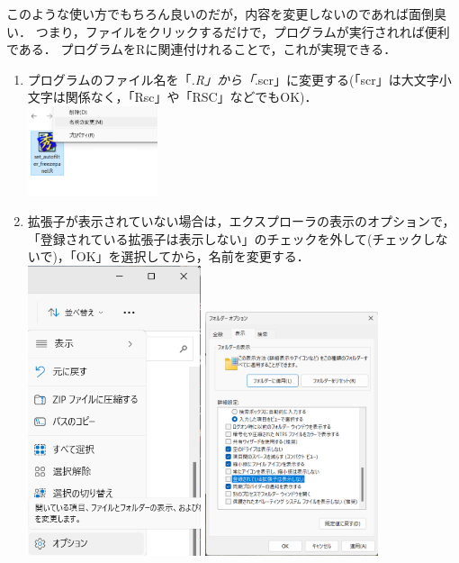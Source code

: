 \documentclass[
]{article}
\providecommand{\tightlist}{%
  \setlength{\itemsep}{0pt}\setlength{\parskip}{0pt}}
\begin{document}
このような使い方でもちろん良いのだが，内容を変更しないのであれば面倒臭い．
つまり，ファイルをクリックするだけで，プログラムが実行されれば便利である．
プログラムをRに関連付けれることで，これが実現できる．

\begin{enumerate}
\def\labelenumi{\arabic{enumi}.}
\tightlist
\item
  プログラムのファイル名を「\emph{.R」から「}.scr」に変更する(「scr」は大文字小文字は関係なく，「Rsc」や「RSC」などでもOK)．\\
  \includegraphics[width=0.3\textwidth,height=\textheight]{img/assoc_01.png}
\item
  拡張子が表示されていない場合は，エクスプローラの表示のオプションで，「登録されている拡張子は表示しない」のチェックを外して(チェックしないで)，「OK」を選択してから，名前を変更する．\\
  \includegraphics[width=0.4\textwidth,height=\textheight]{img/assoc_00_01.png}
  \includegraphics[width=0.4\textwidth,height=\textheight]{img/assoc_00_02.png}

\end{enumerate}
\end{document}
